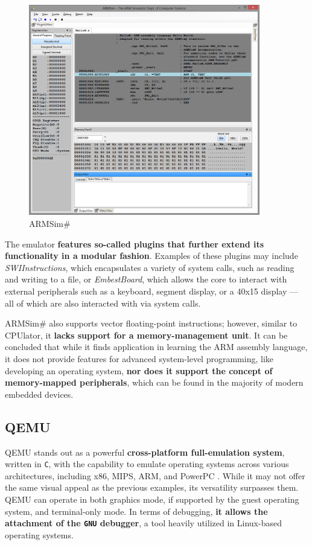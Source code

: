 \documentclass[english, ing, kiv, he, iso690numb, pdf]{fasthesis}
\begin{document}
	\begin{figure}[ht]
		\centering
		\includegraphics[width=0.9\textwidth]{img/diagrams/armsim.png}
		\caption{ARMSim\#}
		\label{ARMSim}
	\end{figure}
	
	The emulator \textbf{features so-called plugins that further extend its functionality in a modular fashion}. Examples of these plugins may include \textit{SWIInstructions}, which encapsulates a variety of system calls, such as reading and writing to a file, or \textit{EmbestBoard}, which allows the core to interact with external peripherals such as a keyboard, segment display, or a 40x15 display — all of which are also interacted with via system calls.
	
	ARMSim\# also supports vector floating-point instructions; however, similar to CPUlator, it \textbf{lacks support for a memory-management unit}. It can be concluded that while it finds application in learning the ARM assembly language, it does not provide features for advanced system-level programming, like developing an operating system, \textbf{nor does it support the concept of memory-mapped peripherals}, which can be found in the majority of modern embedded devices.
	
	\subsection{QEMU}
	
	QEMU stands out as a powerful \textbf{cross-platform full-emulation system}, written in \texttt{C}, with the capability to emulate operating systems across various architectures, including x86, MIPS, ARM, and PowerPC \cite{QEMU}. While it may not offer the same visual appeal as the previous examples, its versatility surpasses them. QEMU can operate in both graphics mode, if supported by the guest operating system, and terminal-only mode. In terms of debugging, \textbf{it allows the attachment of the \texttt{GNU} debugger}, a tool heavily utilized in Linux-based operating systems.
	
\end{document}
